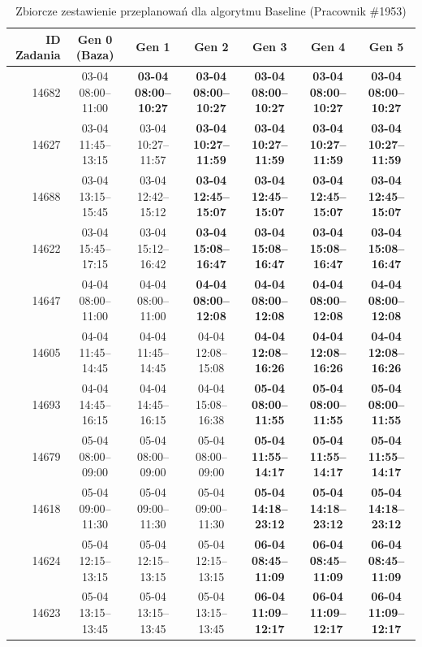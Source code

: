 \begin{table}[htbp]
\centering\scriptsize
\caption{Zbiorcze zestawienie przeplanowań dla algorytmu Baseline (Pracownik \#1953)}
\label{tab:case_study_evolution_baseline_u1953}
\begin{tabular}{|r|c|c|c|c|c|c|}
\hline
\textbf{ID Zadania} & \textbf{Gen 0 (Baza)} & \textbf{Gen 1} & \textbf{Gen 2} & \textbf{Gen 3} & \textbf{Gen 4} & \textbf{Gen 5} \\ \hline
14682 & 03-04 08:00--11:00 & \textbf{03-04 08:00--10:27} & \textbf{03-04 08:00--10:27} & \textbf{03-04 08:00--10:27} & \textbf{03-04 08:00--10:27} & \textbf{03-04 08:00--10:27} \\ 
14627 & 03-04 11:45--13:15 & 03-04 10:27--11:57 & \textbf{03-04 10:27--11:59} & \textbf{03-04 10:27--11:59} & \textbf{03-04 10:27--11:59} & \textbf{03-04 10:27--11:59} \\ 
14688 & 03-04 13:15--15:45 & 03-04 12:42--15:12 & \textbf{03-04 12:45--15:07} & \textbf{03-04 12:45--15:07} & \textbf{03-04 12:45--15:07} & \textbf{03-04 12:45--15:07} \\ 
14622 & 03-04 15:45--17:15 & 03-04 15:12--16:42 & \textbf{03-04 15:08--16:47} & \textbf{03-04 15:08--16:47} & \textbf{03-04 15:08--16:47} & \textbf{03-04 15:08--16:47} \\ 
14647 & 04-04 08:00--11:00 & 04-04 08:00--11:00 & \textbf{04-04 08:00--12:08} & \textbf{04-04 08:00--12:08} & \textbf{04-04 08:00--12:08} & \textbf{04-04 08:00--12:08} \\ 
14605 & 04-04 11:45--14:45 & 04-04 11:45--14:45 & 04-04 12:08--15:08 & \textbf{04-04 12:08--16:26} & \textbf{04-04 12:08--16:26} & \textbf{04-04 12:08--16:26} \\ 
14693 & 04-04 14:45--16:15 & 04-04 14:45--16:15 & 04-04 15:08--16:38 & \textbf{05-04 08:00--11:55} & \textbf{05-04 08:00--11:55} & \textbf{05-04 08:00--11:55} \\ 
14679 & 05-04 08:00--09:00 & 05-04 08:00--09:00 & 05-04 08:00--09:00 & \textbf{05-04 11:55--14:17} & \textbf{05-04 11:55--14:17} & \textbf{05-04 11:55--14:17} \\ 
14618 & 05-04 09:00--11:30 & 05-04 09:00--11:30 & 05-04 09:00--11:30 & \textbf{05-04 14:18--23:12} & \textbf{05-04 14:18--23:12} & \textbf{05-04 14:18--23:12} \\ 
14624 & 05-04 12:15--13:15 & 05-04 12:15--13:15 & 05-04 12:15--13:15 & \textbf{06-04 08:45--11:09} & \textbf{06-04 08:45--11:09} & \textbf{06-04 08:45--11:09} \\ 
14623 & 05-04 13:15--13:45 & 05-04 13:15--13:45 & 05-04 13:15--13:45 & \textbf{06-04 11:09--12:17} & \textbf{06-04 11:09--12:17} & \textbf{06-04 11:09--12:17} \\ 

\end{tabular}
\end{table}
